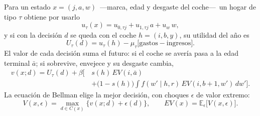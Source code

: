 \documentclass[border=0pt]{standalone}
\begin{document}
\begin{minipage}{26.783cm}\fontsize{27}{33.5}\selectfont\raggedright 
Para un estado $x=(j,a,w)$ \,---marca, edad y desgaste del coche---\, un hogar de
tipo $\tau$ obtiene por usarlo
\[ u_\tau(x)=u_{0,\tau j}+u_{1,\tau j}\,a+u_w\,w , \]
y si con la decisión $d$ se queda con el coche $h=(i,b,y)$, su utilidad del año es
\[ U_\tau(d)=u_\tau(h)-\mu_\tau\Big[\text{gastos}-\text{ingresos}\Big]. \]
El valor de cada decisión suma el futuro: si el coche se avería pasa a la edad
terminal $\bar a$; si sobrevive, envejece y su desgaste cambia,
\[ \begin{aligned} v(x;d)=U_\tau(d)+\beta\Big[\,&s(h)\,EV(i,\bar a)\\
   &+\big(1-s(h)\big)\!\int\! f(w'\mid h,r)\,EV(i,b{+}1,w')\,dw'\Big]. \end{aligned} \]
La ecuación de Bellman elige la mejor decisión, con choques $\epsilon$ de valor
extremo:
\[ V(x,\epsilon)=\max_{d\in C(x)}\Big\{v(x;d)+\epsilon(d)\Big\},\qquad
   EV(x)=\mathbb{E}_\epsilon\Big[V(x,\epsilon)\Big]. \]
\end{minipage}
\end{document}
